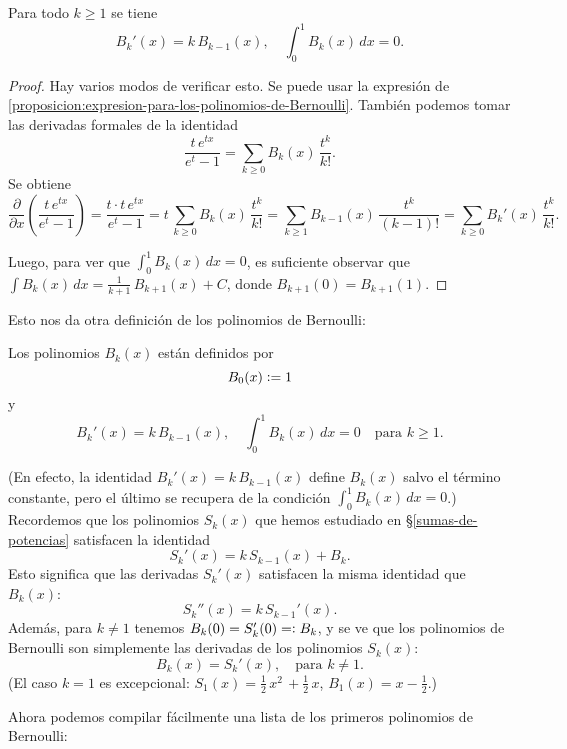 \documentclass{article}
\numberwithin{equation}{section}
\theoremstyle{definition}
\begin{document}
\begin{proposicion}
  Para todo $k \ge 1$ se tiene
  $$B_k' (x) = k\,B_{k-1} (x), \quad \int_0^1 B_k (x)\,dx = 0.$$

  \begin{proof}
    Hay varios modos de verificar esto. Se puede usar la expresión de
    \ref{proposicion:expresion-para-los-polinomios-de-Bernoulli}. También
    podemos tomar las derivadas formales de la identidad
    $$\frac{t\,e^{tx}}{e^t - 1} = \sum_{k \ge 0} B_k (x) \, \frac{t^k}{k!}.$$
    Se obtiene
    $$\frac{\partial}{\partial x} \left(\frac{t\,e^{tx}}{e^t - 1}\right) =
    \frac{t\cdot t\,e^{tx}}{e^t - 1} =
    t\,\sum_{k \ge 0} B_k (x) \, \frac{t^k}{k!} =
    \sum_{k \ge 1} B_{k-1} (x) \, \frac{t^k}{(k-1)!} =
    \sum_{k \ge 0} B_k' (x) \, \frac{t^k}{k!}.$$

    Luego, para ver que $\int_0^1 B_k (x)\,dx = 0$, es suficiente observar que
    $\int B_k (x)\,dx = \frac{1}{k+1}\,B_{k+1} (x) + C$, donde
    $B_{k+1} (0) = B_{k+1} (1)$.
  \end{proof}
\end{proposicion}

Esto nos da otra definición de los polinomios de Bernoulli:

\begin{definicion-alternativa}
  Los polinomios $B_k (x)$ están definidos por
  $$B_0 (x) \mathrel{\mathop:}= 1$$
  y
  $$B_k' (x) = k\,B_{k-1} (x), \quad
  \int_0^1 B_k (x) \, dx = 0 \quad
  \text{para }k \ge 1.$$
\end{definicion-alternativa}

\noindent (En efecto, la identidad $B_k' (x) = k\,B_{k-1} (x)$ define $B_k (x)$
salvo el término constante, pero el último se recupera de la condición
$\int_0^1 B_k (x) \, dx = 0$.) Recordemos que los polinomios $S_k (x)$ que hemos
estudiado en \S\ref{sumas-de-potencias} satisfacen la identidad
$$S_k' (x) = k\,S_{k-1} (x) + B_k.$$
Esto significa que las derivadas $S_k' (x)$ satisfacen la misma identidad que
$B_k (x)$:
$$S_k'' (x) = k\,S_{k-1}' (x).$$
Además, para $k\ne 1$ tenemos $B_k (0) = S_k' (0) =\mathrel{\mathop:} B_k$, y se ve que los
polinomios de Bernoulli son simplemente las derivadas de los polinomios
$S_k (x)$:
$$B_k (x) = S_k' (x), \quad \text{para }k\ne 1.$$
(El caso $k = 1$ es excepcional: $S_1 (x) = \frac{1}{2}\,x^2\,+\frac{1}{2}\,x$,
$B_1 (x) = x - \frac{1}{2}$.)

Ahora podemos compilar fácilmente una lista de los primeros polinomios de
Bernoulli:
\end{document}
